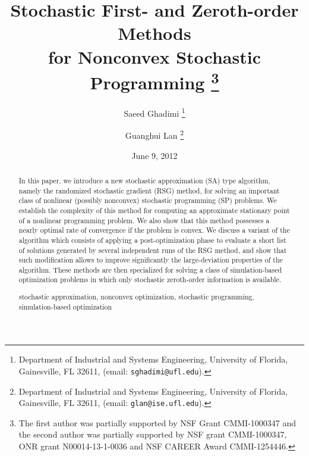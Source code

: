 \documentclass[final]{siamltex}
\title{
Stochastic First- and Zeroth-order Methods\\
for Nonconvex Stochastic Programming
\thanks{The first author was partially supported by
    NSF Grant CMMI-1000347 and the second author was partially supported
    by NSF grant CMMI-1000347,
    ONR grant N00014-13-1-0036 and
    NSF CAREER Award CMMI-1254446.}
}
\date{June 9, 2012}
\author{
    Saeed Ghadimi
    \thanks{
    Department of Industrial and Systems Engineering,
    University of Florida, Gainesville, FL 32611,
       (email: {\tt sghadimi@ufl.edu}).}
\and
    Guanghui Lan
    \thanks{Department of Industrial and Systems Engineering,
    University of Florida, Gainesville, FL 32611,
       (email: {\tt glan@ise.ufl.edu}). }
}
\begin{document}
\maketitle

\begin{abstract}
In this paper, we introduce a new stochastic approximation (SA) type algorithm, namely
the randomized stochastic gradient (RSG) method, for solving an important class of
nonlinear (possibly nonconvex) stochastic programming (SP) problems.
We establish the complexity of this method for computing an approximate stationary point
of a nonlinear programming problem. We also show that this method possesses
a nearly optimal rate of convergence if the problem is convex. We discuss a variant of the algorithm
which consists of applying a post-optimization phase to evaluate a short list of solutions
generated by several independent runs of the RSG method, and show that such modification allows to improve significantly
the large-deviation properties of the algorithm.
These methods are then specialized for solving a class of simulation-based
optimization problems in which only stochastic zeroth-order information is available.

\vspace{.1in}

 stochastic approximation, nonconvex optimization, stochastic programming, simulation-based optimization

\end{abstract}







\setcounter{equation}{0}
\end{document}
